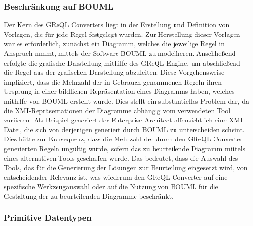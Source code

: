 \subsubsection{Beschränkung auf BOUML}

Der Kern des GReQL Converters liegt in der Erstellung und Definition von Vorlagen, die für jede Regel festgelegt wurden.
Zur Herstellung dieser Vorlagen war es erforderlich, zunächst ein Diagramm, welches die jeweilige Regel in Anspruch
nimmt, mittels der Software BOUML zu modellieren. Anschließend erfolgte die grafische Darstellung mithilfe des GReQL
Engine, um abschließend die Regel aus der grafischen Darstellung abzuleiten. Diese Vorgehensweise impliziert, dass die
Mehrzahl der in Gebrauch genommenen Regeln ihren Ursprung in einer bildlichen Repräsentation eines Diagramms haben,
welches mithilfe von BOUML erstellt wurde. Dies stellt ein substantielles Problem dar, da die XMI-Repräsentationen der
Diagramme abhängig vom verwendeten Tool variieren. Als Beispiel generiert der Enterprise Architect offensichtlich eine
XMI-Datei, die sich von derjenigen generiert durch BOUML zu unterscheiden scheint. Dies hätte zur Konsequenz, dass die
Mehrzahl der durch den GReQL Converter generierten Regeln ungültig würde, sofern das zu beurteilende Diagramm mittels
eines alternativen Tools geschaffen wurde. Das bedeutet, dass die Auswahl des Tools, das für die Generierung der
Lösungen zur Beurteilung eingesetzt wird, von entscheidender Relevanz ist, was wiederum den GReQL Converter auf eine
spezifische Werkzeugauswahl oder auf die Nutzung von BOUML für die Gestaltung der zu beurteilenden Diagramme beschränkt.

\subsubsection{Primitive Datentypen}

